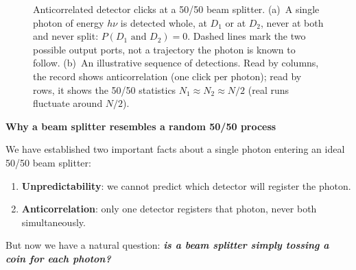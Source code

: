 \begin{figure}[!htp]
    \caption{Anticorrelated detector clicks at a 50/50 beam splitter.
        (a)~A single photon of energy $h\nu$ is detected whole, at $D_1$ or at $D_2$,
        never at both and never split: $P(D_1\text{ and }D_2)=0$. Dashed lines mark the
        two possible output ports, not a trajectory the photon is known to follow.
        (b)~An illustrative sequence of detections. Read by columns, the record shows anticorrelation (one click per photon);
        read by rows, it shows the 50/50 statistics $N_1\approx N_2\approx N/2$
    (real runs fluctuate around $N/2$).}
    \label{fig:beam-splitter-anticorrelation-v3}
\end{figure}

\newpage

\begin{flushleft}
    \textcolor{Green3}{ \textbf{Why a beam splitter resembles a random 50/50 process}}
\end{flushleft}
We have established two important facts about a single photon entering an ideal 50/50 beam splitter:
\begin{enumerate}
    \item \textbf{Unpredictability}: we cannot predict which detector will register the photon.
    \item \textbf{Anticorrelation}: only one detector registers that photon, never both simultaneously.
\end{enumerate}
But now we have a natural question: \emph{\textbf{is a beam splitter simply tossing a coin for each photon?}}

